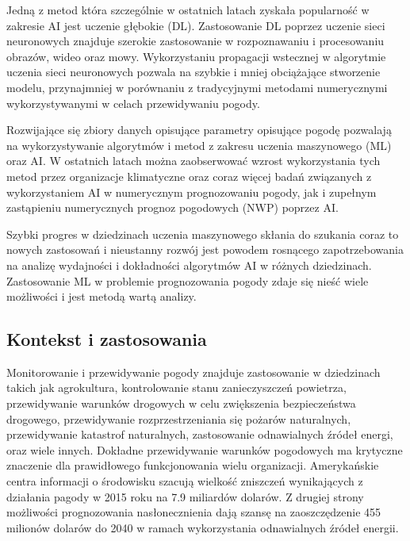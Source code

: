 Jedną z metod która szczególnie w ostatnich latach zyskała popularność w zakresie
AI jest uczenie głębokie (DL). Zastosowanie DL poprzez uczenie sieci neuronowych
znajduje szerokie zastosowanie w rozpoznawaniu i procesowaniu obrazów, wideo oraz
mowy. Wykorzystaniu propagacji wstecznej w algorytmie uczenia sieci neuronowych
pozwala na szybkie i mniej obciążające stworzenie modelu, przynajmniej w porównaniu
z tradycyjnymi metodami numerycznymi wykorzystywanymi w celach przewidywaniu pogody.

Rozwijające się zbiory danych opisujące parametry opisujące pogodę 
pozwalają na wykorzystywanie algorytmów i metod z zakresu uczenia maszynowego (ML)
oraz AI. W ostatnich latach można zaobserwować wzrost wykorzystania tych metod
przez organizacje klimatyczne oraz coraz więcej badań związanych z wykorzystaniem
AI w numerycznym prognozowaniu pogody, jak i zupełnym zastąpieniu numerycznych
prognoz pogodowych (NWP) poprzez AI.

Szybki progres w dziedzinach uczenia maszynowego skłania do szukania coraz to nowych
zastosowań i nieustanny rozwój jest powodem rosnącego zapotrzebowania na analizę
wydajności i dokładności algorytmów AI w różnych dziedzinach. Zastosowanie ML w
problemie prognozowania pogody zdaje się nieść wiele możliwości i jest metodą
wartą analizy. 

\subsection{Kontekst i zastosowania}

Monitorowanie i przewidywanie pogody znajduje zastosowanie w dziedzinach takich
jak agrokultura, kontrolowanie stanu zanieczyszczeń powietrza, 
przewidywanie warunków drogowych w celu zwiększenia bezpieczeństwa drogowego,
przewidywanie rozprzestrzeniania się pożarów naturalnych,
przewidywanie katastrof naturalnych, zastosowanie odnawialnych źródeł energi,
oraz wiele innych. Dokładne przewidywanie warunków pogodowych ma krytyczne znaczenie
dla prawidłowego funkcjonowania wielu organizacji. Amerykańskie centra
informacji o środowisku szacują wielkość zniszczeń wynikających z działania
pagody w 2015 roku na 7.9 miliardów dolarów\cite{using-artificial-intelligence-to-improve}.
Z drugiej strony możliwości prognozowania nasłonecznienia dają szansę na zaoszczędzenie
455 milionów dolarów do 2040 w ramach wykorzystania odnawialnych źródeł energii.

